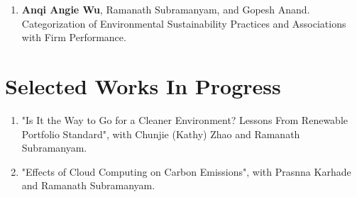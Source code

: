 \documentclass[margin,line]{resume}
\begin{document}
\begin{resume}
\begin{enumerate}[topsep=0pt, leftmargin=*]
 \item \textbf{Anqi Angie Wu}, Ramanath Subramanyam, and Gopesh Anand. 
       Categorization of Environmental Sustainability Practices and Associations with Firm Performance. 
        
       
\end{enumerate}   
  
 	  \section{\mysidestyle Selected Works In Progress} 
 	  \begin{enumerate}[topsep=0pt, leftmargin=*]
         

         \item "Is It the Way to Go for a Cleaner Environment? Lessons From Renewable Portfolio Standard", with Chunjie (Kathy) Zhao and Ramanath Subramanyam.  



       \item "Effects of Cloud Computing on Carbon Emissions", with Prasnna Karhade and Ramanath Subramanyam. 


	  \end{enumerate}
	  


\end{resume}
\end{document}
